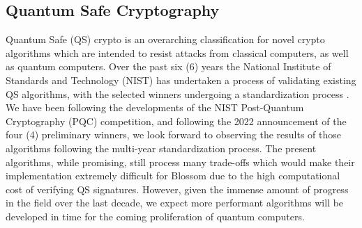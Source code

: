 \subsection{Quantum Safe Cryptography} 
Quantum Safe (QS) crypto is an overarching classification for novel crypto algorithms which are intended to resist attacks from classical computers, as well as quantum computers. Over the past six (6) years the National Institute of Standards and Technology (NIST) has undertaken a process of validating existing QS algorithms, with the selected winners undergoing a standardization process \cite{Boutin2022-jl}. We have been following the developments of the NIST Post-Quantum Cryptography (PQC) competition, and following the 2022 announcement of the four (4) preliminary winners, we look forward to observing the results of those algorithms following the multi-year standardization process. The present algorithms, while promising, still process many trade-offs which would make their implementation extremely difficult for Blossom due to the high computational cost of verifying QS signatures. However, given the immense amount of progress in the field over the last decade, we expect more performant algorithms will be developed in time for the coming proliferation of quantum computers.
